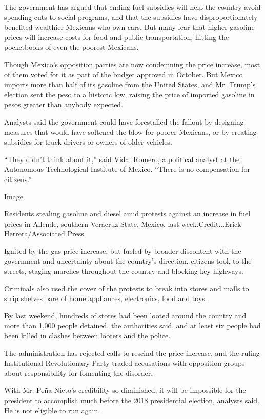The government has argued that ending fuel subsidies will help the
country avoid spending cuts to social programs, and that the subsidies
have disproportionately benefited wealthier Mexicans who own cars. But
many fear that higher gasoline prices will increase costs for food and
public transportation, hitting the pocketbooks of even the poorest
Mexicans.

Though Mexico's opposition parties are now condemning the price
increase, most of them voted for it as part of the budget approved in
October. But Mexico imports more than half of its gasoline from the
United States, and Mr. Trump's election sent the peso to a historic low,
raising the price of imported gasoline in pesos greater than anybody
expected.

Analysts said the government could have forestalled the fallout by
designing measures that would have softened the blow for poorer
Mexicans, or by creating subsidies for truck drivers or owners of older
vehicles.

``They didn't think about it,'' said Vidal Romero, a political analyst
at the Autonomous Technological Institute of Mexico. ``There is no
compensation for citizens.''

Image

Residents stealing gasoline and diesel amid protests against an increase
in fuel prices in Allende, southern Veracruz State, Mexico, last
week.Credit...Erick Herrera/Associated Press

Ignited by the gas price increase, but fueled by broader discontent with
the government and uncertainty about the country's direction, citizens
took to the streets, staging marches throughout the country and blocking
key highways.

Criminals also used the cover of the protests to break into stores and
malls to strip shelves bare of home appliances, electronics, food and
toys.

By last weekend, hundreds of stores had been looted around the country
and more than 1,000 people detained, the authorities said, and at least
six people had been killed in clashes between looters and the police.

The administration has rejected calls to rescind the price increase, and
the ruling Institutional Revolutionary Party traded accusations with
opposition groups about responsibility for fomenting the disorder.

With Mr. Peña Nieto's credibility so diminished, it will be impossible
for the president to accomplish much before the 2018 presidential
election, analysts said. He is not eligible to run again.

